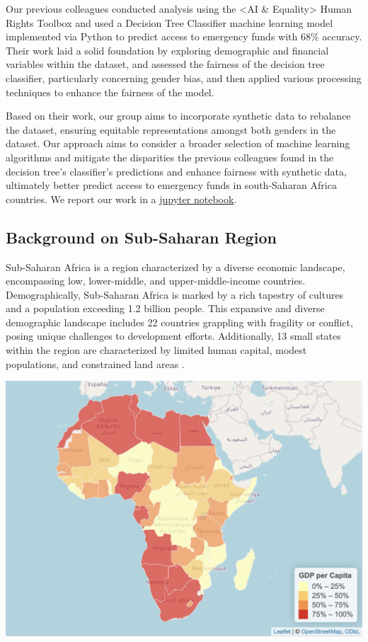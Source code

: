 \documentclass[12pt]{article}
\begin{document}
Our previous colleagues conducted analysis using the \textless AI \&
Equality\textgreater{} Human Rights Toolbox and used a Decision Tree
Classifier machine learning model implemented via Python to predict
access to emergency funds with 68\% accuracy. Their work laid a solid
foundation by exploring demographic and financial variables within the
dataset, and assessed the fairness of the decision tree classifier,
particularly concerning gender bias, and then applied various processing
techniques to enhance the fairness of the model\citep{Porta2022}.

Based on their work, our group aims to incorporate synthetic data to
rebalance the dataset, ensuring equitable representations amongst both
genders in the dataset. Our approach aims to consider a broader
selection of machine learning algorithms and mitigate the disparities
the previous colleagues found in the decision tree's classifier's
predictions and enhance fairness with synthetic data, ultimately better
predict access to emergency funds in south-Saharan Africa
countries\citep{SyntheticDataAIEquality}. We report our work in a
\href{https://colab.research.google.com/drive/10Fwjp8X8FvKoSy_AWASBTrHFwgOQOOWn}{jupyter
notebook}.

\hypertarget{background-on-sub-saharan-region}{%
\subsection{Background on Sub-Saharan
Region}\label{background-on-sub-saharan-region}}

Sub-Saharan Africa is a region characterized by a diverse economic
landscape, encompassing low, lower-middle, and upper-middle-income
countries. Demographically, Sub-Saharan Africa is marked by a rich
tapestry of cultures and a population exceeding 1.2 billion people. This
expansive and diverse demographic landscape includes 22 countries
grappling with fragility or conflict, posing unique challenges to
development efforts. Additionally, 13 small states within the region are
characterized by limited human capital, modest populations, and
constrained land areas \citep{Rustomjee_Balasubramanian_Li_2022}.

\begin{center}\includegraphics[width=0.7\linewidth]{graphs/map} \end{center}
\end{document}

